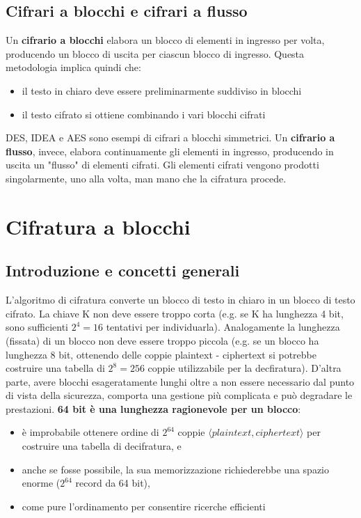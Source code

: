 \subsection{Cifrari a blocchi e cifrari a flusso}
Un \textbf{cifrario a blocchi} elabora un blocco di elementi in ingresso per volta, producendo un blocco di uscita per ciascun blocco di ingresso. Questa metodologia implica quindi che:
\begin{itemize}
  \item il testo in chiaro deve essere preliminarmente suddiviso in blocchi
  \item il testo cifrato si ottiene combinando i vari blocchi cifrati
\end{itemize}
DES, IDEA e AES sono esempi di cifrari a blocchi simmetrici. Un \textbf{cifrario a flusso}, invece, elabora continuamente gli elementi in ingresso, producendo in uscita un "flusso" di elementi cifrati. Gli elementi cifrati vengono prodotti singolarmente, uno alla volta, man mano che la cifratura procede.

\section{Cifratura a blocchi}

\subsection{Introduzione e concetti generali}
L’algoritmo di cifratura converte un blocco di testo in chiaro in un blocco di testo cifrato. La chiave K non deve essere troppo corta (e.g. se K ha lunghezza 4 bit, sono sufficienti $2^4 = 16$ tentativi per individuarla). Analogamente la lunghezza (fissata) di un blocco non deve essere troppo piccola (e.g. se un blocco ha lunghezza 8 bit, ottenendo delle coppie plaintext - ciphertext si potrebbe costruire una tabella di $2^8 = 256$ coppie utilizzabile per la decfiratura).\newline 
D'altra parte, avere blocchi esageratamente lunghi oltre a non essere necessario dal punto di vista della sicurezza, comporta una gestione più complicata e può degradare le prestazioni. \textbf{64 bit è una lunghezza ragionevole per un blocco}: 
\begin{itemize}
  \item è improbabile ottenere ordine di $2^{64}$ coppie $\langle plaintext, ciphertext \rangle$ per costruire una tabella di decifratura, e
  \item anche se fosse possibile, la sua memorizzazione richiederebbe una spazio enorme ($2^{64}$ record da 64 bit),
  \item come pure l’ordinamento per consentire ricerche efficienti
\end{itemize}

